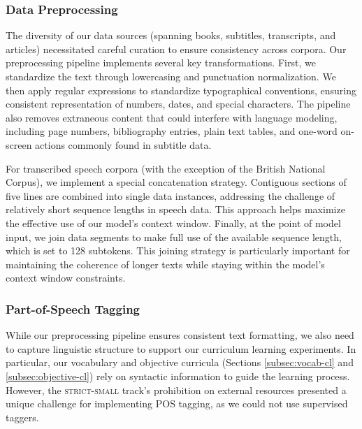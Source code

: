 \subsubsection{Data Preprocessing}
The diversity of our data sources (spanning books, subtitles, transcripts, and articles) necessitated careful curation to ensure consistency across corpora. Our preprocessing pipeline implements several key transformations. First, we standardize the text through lowercasing and punctuation normalization. We then apply regular expressions to standardize typographical conventions, ensuring consistent representation of numbers, dates, and special characters. The pipeline also removes extraneous content that could interfere with language modeling, including page numbers, bibliography entries, plain text tables, and one-word on-screen actions commonly found in subtitle data.

For transcribed speech corpora (with the exception of the British National Corpus), we implement a special concatenation strategy. Contiguous sections of five lines are combined into single data instances, addressing the challenge of relatively short sequence lengths in speech data. This approach helps maximize the effective use of our model's context window. Finally, at the point of model input, we join data segments to make full use of the available sequence length, which is set to 128 subtokens. This joining strategy is particularly important for maintaining the coherence of longer texts while staying within the model's context window constraints.

\subsubsection{Part-of-Speech Tagging}

While our preprocessing pipeline ensures consistent text formatting, we also need to capture linguistic structure to support our curriculum learning experiments. In particular, our vocabulary and objective curricula (Sections \ref{subsec:vocab-cl} and \ref{subsec:objective-cl}) rely on syntactic information to guide the learning process. However, the \textsc{strict-small} track's prohibition on external resources presented a unique challenge for implementing POS tagging, as we could not use supervised taggers.

